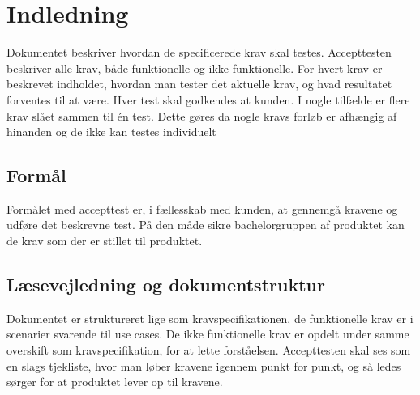 	\chapter{Indledning}
	Dokumentet beskriver hvordan de specificerede krav skal testes. Accepttesten beskriver alle krav, både funktionelle og ikke funktionelle. For hvert krav er beskrevet indholdet, hvordan man tester det aktuelle krav, og hvad resultatet forventes til at være. Hver test skal godkendes at kunden. 
	I nogle tilfælde er flere krav slået sammen til én test. Dette gøres da nogle kravs forløb er afhængig af hinanden og de ikke kan testes individuelt 
	
	\section{Formål}
	Formålet med accepttest er, i fællesskab med kunden, at gennemgå kravene og udføre det beskrevne test. På den måde sikre bachelorgruppen af produktet kan de krav som der er stillet til produktet. 
	
	\section{Læsevejledning og dokumentstruktur}
	Dokumentet er struktureret lige som kravspecifikationen, de funktionelle krav er i scenarier svarende til use cases. De ikke funktionelle krav er opdelt under samme overskift som kravspecifikation, for at lette forståelsen. 
	Accepttesten skal ses som en slags tjekliste, hvor man løber kravene igennem punkt for punkt, og så ledes sørger for at produktet lever op til kravene. 
	
	\newpage
